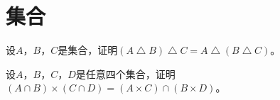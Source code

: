 \chapter{集合}

\begin{Ex}
设$A$，$B$，$C$是集合，证明$(A\bigtriangleup B)\bigtriangleup C =
A\bigtriangleup (B\bigtriangleup C)$。
\end{Ex}

\begin{Ex}
设$A$，$B$，$C$，$D$是任意四个集合，证明$(A\cap B) \times (C \cap D) = (A
\times C)
\cap (B \times D)$。
\end{Ex}
